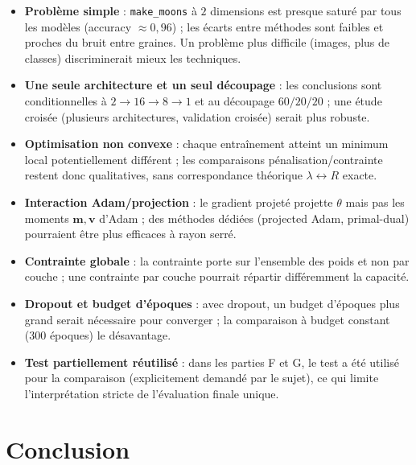 \documentclass[11pt,a4paper]{article}
\newcommand{\vect}[1]{\mathbf{#1}}
\begin{document}
\begin{itemize}
  \item \textbf{Problème simple} : \texttt{make\_moons} à $2$ dimensions est presque saturé par tous les modèles (accuracy $\approx 0{,}96$) ; les écarts entre méthodes sont faibles et proches du bruit entre graines. Un problème plus difficile (images, plus de classes) discriminerait mieux les techniques.
  \item \textbf{Une seule architecture et un seul découpage} : les conclusions sont conditionnelles à $2 \to 16 \to 8 \to 1$ et au découpage $60/20/20$ ; une étude croisée (plusieurs architectures, validation croisée) serait plus robuste.
  \item \textbf{Optimisation non convexe} : chaque entraînement atteint un minimum local potentiellement différent ; les comparaisons pénalisation/contrainte restent donc qualitatives, sans correspondance théorique $\lambda \leftrightarrow R$ exacte.
  \item \textbf{Interaction Adam/projection} : le gradient projeté projette $\theta$ mais pas les moments $\vect{m}, \vect{v}$ d'Adam ; des méthodes dédiées (projected Adam, primal-dual) pourraient être plus efficaces à rayon serré.
  \item \textbf{Contrainte globale} : la contrainte porte sur l'ensemble des poids et non par couche ; une contrainte par couche pourrait répartir différemment la capacité.
  \item \textbf{Dropout et budget d'époques} : avec dropout, un budget d'époques plus grand serait nécessaire pour converger ; la comparaison à budget constant (300 époques) le désavantage.
  \item \textbf{Test partiellement réutilisé} : dans les parties F et G, le test a été utilisé pour la comparaison (explicitement demandé par le sujet), ce qui limite l'interprétation stricte de l'évaluation finale unique.
\end{itemize}

\section{Conclusion}
\end{document}
